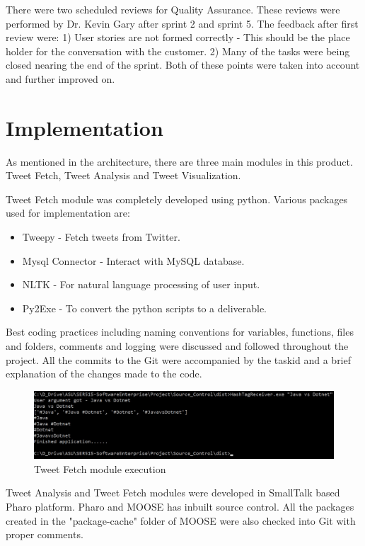 \documentclass[11pt]{article}
\begin{document}
There were two scheduled reviews for Quality Assurance. These reviews were performed by Dr. Kevin Gary after sprint 2 and sprint 5. The feedback after first review were: 1) User stories are not formed correctly - This should be the place holder for the conversation with the customer. 2) Many of the tasks were being closed  nearing the end of the sprint. Both of these points were taken into account and further improved on.

\section{Implementation}
As mentioned in the architecture, there are three main modules in this product. Tweet Fetch, Tweet Analysis and Tweet Visualization. 

Tweet Fetch module was completely developed using python. Various packages used for implementation are:
\begin{itemize}
\item Tweepy - Fetch tweets from Twitter.
\item Mysql Connector - Interact with MySQL database.
\item NLTK - For natural language processing of user input.
\item Py2Exe - To convert the python scripts to a deliverable.
\end{itemize}

Best coding practices including naming conventions for variables, functions, files and folders, comments and logging were discussed and followed throughout the project. All the commits to the Git were accompanied by the taskid and a brief explanation of the changes made to the code.

\begin{figure}[h]
\centering
\includegraphics[width=\textwidth]{TweetFetchImp.jpg}
\caption{Tweet Fetch module execution}
\end{figure}

Tweet Analysis and Tweet Fetch modules were developed in SmallTalk based Pharo platform. Pharo and MOOSE has inbuilt source control. All the packages created in the "package-cache" folder of MOOSE were also checked into Git with proper comments.
\end{document}
